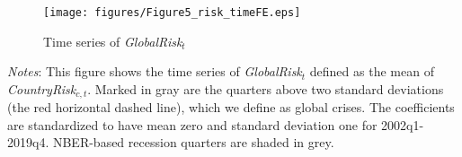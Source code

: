\documentclass[12pt,oneside,leqno]{article}
\begin{document}



\clearpage
\begin{figure}[!h]
\caption{Time series of \textit{GlobalRisk}$_{t}$} \label{fig:globalrisk}
\texttt{[image: figures/Figure5\_risk\_timeFE.eps]}
\end{figure}
\vspace{-.3in}
\begin{minipage}[t]{.96\textwidth}
\footnotesize\textit{Notes}: This figure shows the time series of \textit{GlobalRisk}$_{t}$ defined as the mean of \textit{CountryRisk}$_{c,t}$. Marked in gray are the quarters above two standard deviations (the red horizontal dashed line), which we define as global crises. The coefficients are standardized to have mean zero and standard deviation one for 2002q1-2019q4. NBER-based recession quarters are shaded in grey.
\end{minipage}



\clearpage
\end{document}
